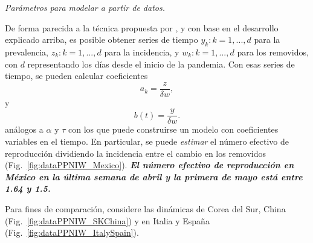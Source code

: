 \documentclass[8pt]{article}
\begin{document}
\textit{Parámetros para modelar a partir de datos.}

De forma parecida a la técnica propuesta por \cite{lega2016data}, y con base en el desarrollo explicado arriba, es posible obtener series de tiempo ${y_{k}: k =1,...,d}$ para la prevalencia,  ${z_{k}: k =1,...,d}$ para la incidencia, y ${w_{k}: k =1,...,d}$ para los removidos, con $d$ representando los días desde el inicio de la pandemia. 
Con esas series de tiempo, se pueden calcular coeficientes 
\begin{equation}a_{k} = \frac{z}{\delta w},\end{equation} 
y 
\begin{equation}b(t) = \frac{y}{\delta w}. \end{equation} 
análogos a $\alpha$ y $\tau$ con los que puede construirse un modelo con coeficientes variables en el tiempo. 
En particular, se puede \textit{estimar} el número efectivo de reproducción dividiendo la incidencia entre el cambio en los removidos (Fig.~\ref{fig:dataPPNIW_Mexico}). \textbf{\textit{El número efectivo de reproducción en México en la última semana de abril y la primera de mayo está entre 1.64 y 1.5. }}

Para fines de comparación, considere las dinámicas de Corea del Sur,  China (Fig.~\ref{fig:dataPPNIW_SKChina}) y en Italia y España (Fig.~\ref{fig:dataPPNIW_ItalySpain}). 
\end{document}
